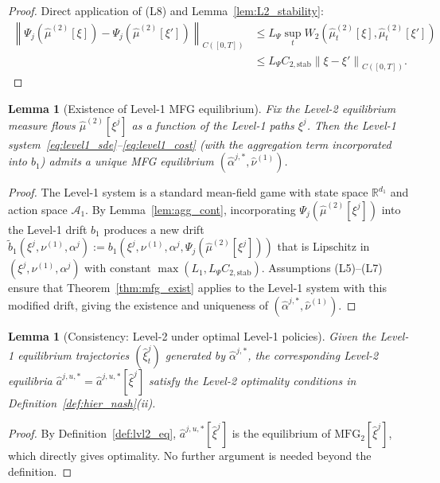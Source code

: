 \documentclass[12pt,a4paper]{article}
\theoremstyle{plain}
\newtheorem{lemma}[theorem]{Lemma}
\theoremstyle{definition}
\newcommand{\R}{\mathbb{R}}
\newcommand{\A}{\mathcal{A}}
\newcommand{\1}{\mathbbm{1}}
\newcommand{\norm}[1]{\left\|#1\right\|}
\newcommand{\WD}[2]{W_2(#1,#2)}  %
\begin{document}
\begin{proof}
Direct application of (L8) and Lemma~\ref{lem:L2_stability}:
\begin{align*}
\norm{\Psi_j(\hat\mu^{(2)}[\xi]) - \Psi_j(\hat\mu^{(2)}[\xi'])}_{C([0,T])}
&\leq L_\Psi \sup_t \WD{\hat\mu^{(2)}_t[\xi]}{\hat\mu^{(2)}_t[\xi']} \\
&\leq L_\Psi C_{2,\mathrm{stab}}\norm{\xi - \xi'}_{C([0,T])}.
\end{align*}
\end{proof}

\begin{lemma}[Existence of Level-1 MFG equilibrium]
\label{lem:L1_exist}
Fix the Level-2 equilibrium measure flows $\hat\mu^{(2)}[\xi^j]$ as a function
of the Level-1 paths $\xi^j$. Then the Level-1 system~\eqref{eq:level1_sde}--\eqref{eq:level1_cost} (with the aggregation term incorporated into $b_1$) admits a unique MFG equilibrium $(\hat\alpha^{j,*}, \hat\nu^{(1)})$.
\end{lemma}

\begin{proof}
The Level-1 system is a standard mean-field game with state space $\R^{d_1}$
and action space $\A_1$.  By Lemma~\ref{lem:agg_cont}, incorporating
$\Psi_j(\hat\mu^{(2)}[\xi^j])$ into the Level-1 drift $b_1$ produces a new
drift $\tilde{b}_1(\xi^j, \nu^{(1)}, \alpha^j) := b_1(\xi^j, \nu^{(1)}, \alpha^j,
\Psi_j(\hat\mu^{(2)}[\xi^j]))$ that is Lipschitz in $(\xi^j, \nu^{(1)}, \alpha^j)$
with constant $\max(L_1, L_\Psi C_{2,\mathrm{stab}})$.
Assumptions (L5)--(L7) ensure that Theorem~\ref{thm:mfg_exist} applies to the
Level-1 system with this modified drift, giving the existence and uniqueness
of $(\hat\alpha^{j,*}, \hat\nu^{(1)})$.
\end{proof}

\begin{lemma}[Consistency: Level-2 under optimal Level-1 policies]
\label{lem:consistency}
Given the Level-1 equilibrium trajectories $(\hat\xi^j_t)$ generated by
$\hat\alpha^{j,*}$, the corresponding Level-2 equilibria
$\hat{a}^{j,u,*} = \hat{a}^{j,u,*}[\hat\xi^j]$ satisfy the Level-2
optimality conditions in Definition~\ref{def:hier_nash}(ii).
\end{lemma}

\begin{proof}
By Definition~\ref{def:lvl2_eq}, $\hat{a}^{j,u,*}[\hat\xi^j]$ is the
equilibrium of $\mathrm{MFG}_2[\hat\xi^j]$, which directly gives optimality.
No further argument is needed beyond the definition.
\end{proof}
\end{document}
